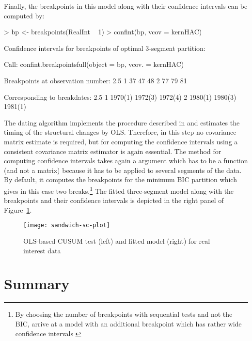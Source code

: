 \documentclass{Z}
\begin{document}
Finally, the breakpoints in this model along with their confidence intervals
can be computed by:
\begin{Schunk}
\begin{Sinput}
> bp <- breakpoints(RealInt ~ 1)
> confint(bp, vcov = kernHAC)
\end{Sinput}
\begin{Soutput}
	 Confidence intervals for breakpoints
	 of optimal 3-segment partition: 

Call:
confint.breakpointsfull(object = bp, vcov. = kernHAC)

Breakpoints at observation number:
  2.5 % breakpoints 97.5 %
1    37          47     48
2    77          79     81

Corresponding to breakdates:
  2.5 %   breakpoints 97.5 % 
1 1970(1) 1972(3)     1972(4)
2 1980(1) 1980(3)     1981(1)
\end{Soutput}
\end{Schunk}
The dating algorithm  implements the procedure described in
\cite{hac:Bai+Perron:2003} and estimates the timing of the structural changes
by OLS. Therefore, in this step no covariance matrix estimate is required, but for
computing the confidence intervals using a consistent covariance matrix estimator
is again essential. The  method for computing confidence intervals
takes again a  argument which has to be a function (and not a matrix) because
it has to be applied to several segments of the data. By default, it computes the
breakpoints for the minimum BIC partition which gives in this case two
breaks.\footnote{By choosing the number of breakpoints with sequential tests 
and not the BIC, \cite{hac:Bai+Perron:2003} arrive at a model with an additional 
breakpoint which has rather wide confidence intervals \citep[see also][]{hac:Zeileis+Kleiber:2004}}
The fitted three-segment model along with the breakpoints and their confidence
intervals is depicted in the right panel of Figure~\ref{fig:sc}.

\begin{figure}[tbh]
\begin{center}
\texttt{[image: sandwich-sc-plot]}
\caption{\label{fig:sc} OLS-based CUSUM test (left) and fitted model (right) for real interest data}
\end{center}
\end{figure}


\section{Summary} \label{sec:summary}
\end{document}
